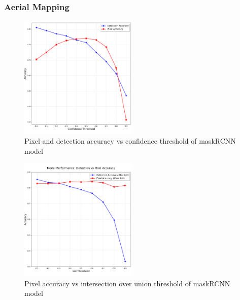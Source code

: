 \documentclass[final]{cmpreport_02}
\begin{document}
\subsubsection{Aerial Mapping}
%
%
%
%
%
%
%
%
%



\begin{figure}[h!]
	\centering
	\includegraphics[width=0.5\textwidth]{./images/AEConfidenceCombined.png}
	\caption{Pixel and detection accuracy vs confidence threshold of maskRCNN model}
	\label{AE:Confidence}
\end{figure}

\begin{figure}[h!]
	\centering
	\includegraphics[width=0.5\textwidth]{./images/AEIOUCombined.png}
	\caption{Pixel accuracy vs intersection over union threshold of maskRCNN model}
	\label{AE:IOU}
\end{figure}
\end{document}
